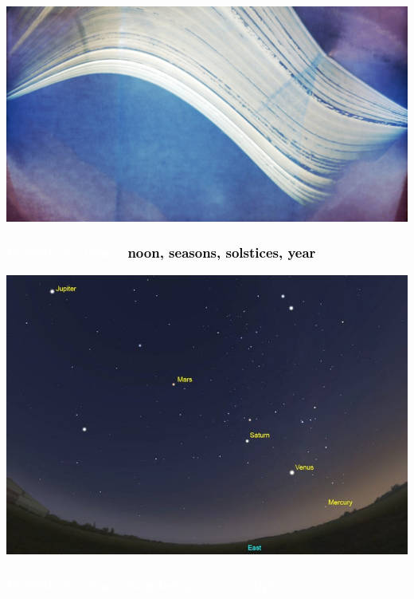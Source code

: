 \documentclass[aspectratio=169,xcolor=pdftex,dvipsnames]{beamer} %
\begin{document}
{
{
    \includegraphics[width=\paperwidth]{solstice.jpg}
}
\begin{frame}
\frametitle{\textcolor{white}{Prehistoric times:} \textcolor{black}{noon, seasons, solstices, year}}
 
\end{frame}
}



{
{
    \includegraphics[width=\paperwidth,height=\paperheight]{wanderingStars.jpeg}
}
\begin{frame}
\frametitle{\textcolor{white}{\hspace{3.5cm}Prehistoric times: wandering stars, ecliptic}}
 
\end{frame}
}

\end{document}
